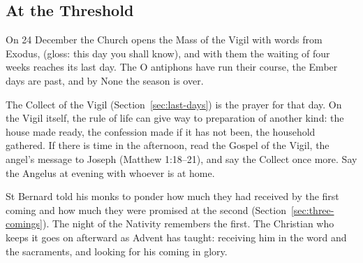 \subsection{At the Threshold}\label{sec:threshold}

On 24 December the Church opens the Mass of the Vigil with words from Exodus,
 (gloss: this day you shall know), and with them the waiting of four weeks
reaches its last day. The O antiphons have run their course, the Ember days are past, and by None
the season is over.

The Collect of the Vigil (Section~\ref{sec:last-days}) is the prayer for that day. On the Vigil
itself, the rule of life can give way to preparation of another kind: the house made
ready, the confession made if it has not been, the household gathered. If there is time in the
afternoon, read the Gospel of the Vigil, the angel's message to Joseph (Matthew 1:18--21), and say
the Collect once more. Say the Angelus at evening with whoever is at home.

St Bernard told his monks to ponder how much they had received by the first coming and how much
they were promised at the second (Section~\ref{sec:three-comings}). The night of the Nativity
remembers the first. The Christian who keeps it goes on afterward as Advent has taught: receiving
him in the word and the sacraments, and looking for his coming in glory.
